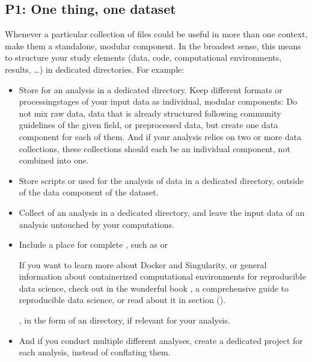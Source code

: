 \subsection{P1: One thing, one dataset}
\label{\detokenize{basics/101-127-yoda:p1-one-thing-one-dataset}}\label{\detokenize{basics/101-127-yoda:p1}}
\sphinxAtStartPar
Whenever a particular collection of files could be useful in more
than one context, make them a standalone, modular component.
In the broadest sense, this means to structure your study elements (data, code,
computational environments, results, …) in dedicated directories. For example:
\begin{itemize}
\item {} 
\sphinxAtStartPar
Store  for an analysis in a dedicated  directory.
Keep different formats or processing\sphinxhyphen{}stages of your input data as individual,
modular components:  Do not mix raw data, data that is already structured
following community guidelines of the given field, or preprocessed data, but create
one data component for each of them. And if your analysis
relies on two or more data collections, these collections should each be an
individual component, not combined into one.

\item {} 
\sphinxAtStartPar
Store scripts or  used for the analysis of data in a dedicated 
directory, outside of the data component of the dataset.

\item {} 
\sphinxAtStartPar
Collect  of an analysis in a dedicated  directory, and
leave the input data of an analysis untouched by your computations.

\item {} 
\sphinxAtStartPar
Include a place for complete , such as
 or
%
\begin{footnote}\sphinxAtStartFootnote
If you want to learn more about Docker and Singularity, or general information
about containerized computational environments for reproducible data science,
check out 
in the wonderful book ,
a comprehensive guide to reproducible data science, or read about it in
section {\hyperref[\detokenize{basics/101-133-containersrun:containersrun}]{}} ().
%
\end{footnote}, in
the form of an  directory, if relevant for your analysis.

\item {} 
\sphinxAtStartPar
And if you conduct multiple different analyses, create a dedicated
project for each analysis, instead of conflating them.

\end{itemize}

